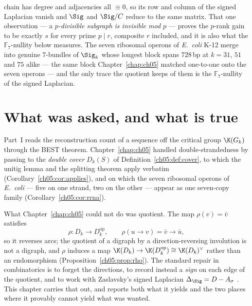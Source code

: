 \begin{chaptersummary}
chain has degree and adjacencies all $\equiv0$, so its row and column of the signed Laplacian
vanish and $\Sig$ and $\Sig/C$ reduce to the same matrix. That one observation --- a
\emph{$p$-divisible subgraph is invisible mod $p$} --- proves the $p$-rank gain to be exactly
$s$ for every prime $p\mid r$, composite $r$ included, and it is also what the
$\mathbb{F}_7$-nullity below measures.
The seven ribosomal operons of \emph{E.\ coli} K-12 merge into genuine
$7$-bundles of $\Sig_k$ whose longest block spans $728$\,bp at $k=31$, $51$ and $75$ alike ---
the same block Chapter~\ref{chap:ch05} matched one-to-one onto the seven operons --- and the only
trace the quotient keeps of them is the $\mathbb{F}_7$-nullity of the signed Laplacian.
\end{chaptersummary}

\section{What was asked, and what is true}\label{ch06:sec:asked}

Part~I reads the reconstruction count of a sequence off the critical group $\K(G_k)$ through
the BEST theorem. Chapter~\ref{chap:ch05} handled double-strandedness by passing to the
\emph{double cover} $D_k(S)$ of Definition~\ref{ch05:def:cover}, to which the unitig lemma and
the splitting theorem apply verbatim (Corollary~\ref{ch05:cor:applies}), and on which the seven
ribosomal operons of \emph{E.\ coli} --- five on one strand, two on the other --- appear as one
seven-copy family (Corollary~\ref{ch05:cor:rrna}).

What Chapter~\ref{chap:ch05} could not do was quotient. The map $\rho(v)=\bar v$ satisfies
\[
  \rho\colon D_k \longrightarrow D_k^{\mathrm{op}},\qquad
  \rho(u\to v)=\bar v\to\bar u ,
\]
so it reverses arcs; the quotient of a digraph by a direction-reversing involution is not a
digraph, and $\rho$ induces a map $\K(D_k)\to\K(D_k^{\mathrm{op}})\cong\K(D_k)^\vee$ rather
than an endomorphism (Proposition~\ref{ch05:prop:rho}). The standard repair in combinatorics is to forget the directions, to
record instead a \emph{sign} on each edge of the quotient, and to work with Zaslavsky's
signed Laplacian $\Delta_\Sig=D-A_\sigma$ \cite{Zas82}. This chapter carries that out, and
reports both what it yields and the two places where it provably cannot yield what was
wanted.

